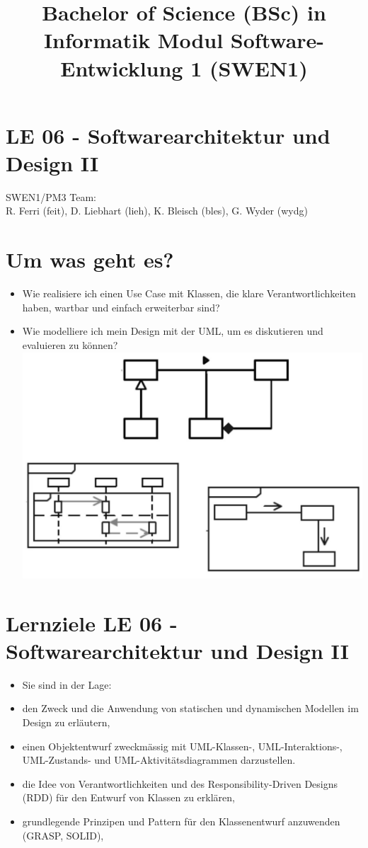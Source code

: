 \documentclass[10pt]{article}
\title{Bachelor of Science (BSc) in Informatik Modul Software-Entwicklung 1 (SWEN1) }
\author{}
\date{}
\begin{document}
\maketitle
\section*{LE 06 - Softwarearchitektur und Design II}
SWEN1/PM3 Team:\\
R. Ferri (feit), D. Liebhart (lieh), K. Bleisch (bles), G. Wyder (wydg)

\section*{Um was geht es?}
\begin{itemize}
  \item Wie realisiere ich einen Use Case mit Klassen, die klare Verantwortlichkeiten haben, wartbar und einfach erweiterbar sind?
  \item Wie modelliere ich mein Design mit der UML, um es diskutieren und evaluieren zu können?\\
\includegraphics[width=\linewidth]{images/2025_01_02_787afb9584031d2940deg-02}
\end{itemize}

\section*{Lernziele LE 06 - Softwarearchitektur und Design II}
\begin{itemize}
  \item Sie sind in der Lage:
  \item den Zweck und die Anwendung von statischen und dynamischen Modellen im Design zu erläutern,
  \item einen Objektentwurf zweckmässig mit UML-Klassen-, UML-Interaktions-, UML-Zustands- und UML-Aktivitätsdiagrammen darzustellen.
  \item die Idee von Verantwortlichkeiten und des Responsibility-Driven Designs (RDD) für den Entwurf von Klassen zu erklären,
  \item grundlegende Prinzipen und Pattern für den Klassenentwurf anzuwenden (GRASP, SOLID),
\end{itemize}
\end{document}
